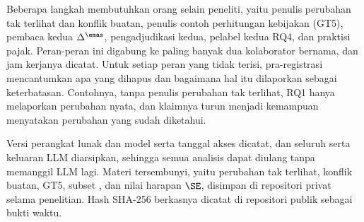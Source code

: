 Beberapa langkah membutuhkan orang selain peneliti, yaitu penulis perubahan tak terlihat dan konflik buatan, penulis contoh perhitungan kebijakan (GT5), pembaca kedua $\Delta^{\emas}$, pengadjudikasi kedua, pelabel kedua RQ4, dan praktisi pajak. Peran-peran ini digabung ke paling banyak dua kolaborator bernama, dan jam kerjanya dicatat. Untuk setiap peran yang tidak terisi, pra-registrasi mencantumkan apa yang dihapus dan bagaimana hal itu dilaporkan sebagai keterbatasan. Contohnya, tanpa penulis perubahan tak terlihat, RQ1 hanya melaporkan perubahan nyata, dan klaimnya turun menjadi kemampuan menyatakan perubahan yang sudah diketahui.

Versi perangkat lunak dan model serta tanggal akses dicatat, dan seluruh  serta keluaran LLM diarsipkan, sehingga semua analisis dapat diulang tanpa memanggil LLM lagi. Materi tersembunyi, yaitu perubahan tak terlihat, konflik buatan, GT5, subset , dan nilai harapan $\SE$, disimpan di repositori privat selama penelitian. Hash SHA-256 berkasnya dicatat di repositori publik sebagai bukti waktu.

